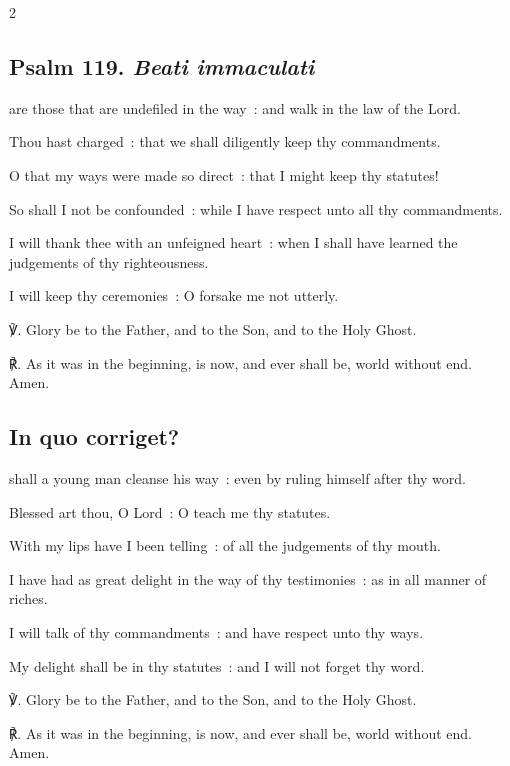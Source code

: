\begin{multicols}{2}
\subsection{Psalm 119. \textit{Beati immaculati}}

 are those that are undefiled in the way~: and walk in the law of the Lord.\par
{}
Thou hast charged~: that we shall diligently keep thy commandments.\par
{}O that my ways were made so direct~: that I might keep thy statutes!\par
{}So shall I not be confounded~: while I have respect unto all thy commandments.\par
{}I will thank thee with an un\-feign\-ed heart~: when I shall have learned the judgements of thy righteousness.\par
{}I will keep thy ceremonies~: O forsake me not utterly.\par
℣. Glory be to the Father, and to the Son, and to the Holy Ghost.\par
℟. As it was in the beginning, is now, and ever shall be, world without end. Amen.

\vspace{-0.75\baselineskip}

\subsection{In quo corriget?}

\vspace{-0.25\baselineskip}

 shall a young man cleanse his way~: even by ruling himself after thy word.\par
{}
Blessed art thou, O Lord~: O teach me thy statutes.\par
{}With my lips have I been telling~: of all the judgements of thy mouth.\par
{}I have had as great delight in the way of thy testimonies~: as in all manner of riches.\par
{}I will talk of thy commandments~: and have respect unto thy ways.\par
{}My delight shall be in thy statutes~: and I will not forget thy word.\par
℣. Glory be to the Father, and to the Son, and to the Holy Ghost.\par
℟. As it was in the beginning, is now, and ever shall be, world without end. Amen.


\end{multicols}
